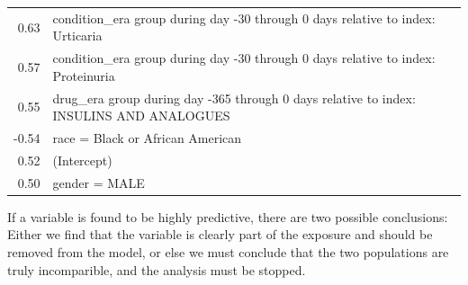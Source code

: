 \documentclass[]{book}
\let\BeginKnitrBlock\begin \let\EndKnitrBlock\end
\begin{document}
\begin{longtable}[]{@{}rl@{}}
\begin{minipage}[t]{0.07\columnwidth}\raggedleft\strut
0.63\strut
\end{minipage} & \begin{minipage}[t]{0.87\columnwidth}\raggedright\strut
condition\_era group during day -30 through 0 days relative to index:
Urticaria\strut
\end{minipage}\tabularnewline
\begin{minipage}[t]{0.07\columnwidth}\raggedleft\strut
0.57\strut
\end{minipage} & \begin{minipage}[t]{0.87\columnwidth}\raggedright\strut
condition\_era group during day -30 through 0 days relative to index:
Proteinuria\strut
\end{minipage}\tabularnewline
\begin{minipage}[t]{0.07\columnwidth}\raggedleft\strut
0.55\strut
\end{minipage} & \begin{minipage}[t]{0.87\columnwidth}\raggedright\strut
drug\_era group during day -365 through 0 days relative to index:
INSULINS AND ANALOGUES\strut
\end{minipage}\tabularnewline
\begin{minipage}[t]{0.07\columnwidth}\raggedleft\strut
-0.54\strut
\end{minipage} & \begin{minipage}[t]{0.87\columnwidth}\raggedright\strut
race = Black or African American\strut
\end{minipage}\tabularnewline
\begin{minipage}[t]{0.07\columnwidth}\raggedleft\strut
0.52\strut
\end{minipage} & \begin{minipage}[t]{0.87\columnwidth}\raggedright\strut
(Intercept)\strut
\end{minipage}\tabularnewline
\begin{minipage}[t]{0.07\columnwidth}\raggedleft\strut
0.50\strut
\end{minipage} & \begin{minipage}[t]{0.87\columnwidth}\raggedright\strut
gender = MALE\strut
\end{minipage}\tabularnewline
\bottomrule
\end{longtable}

\BeginKnitrBlock{rmdimportant}
If a variable is found to be highly predictive, there are two possible
conclusions: Either we find that the variable is clearly part of the
exposure and should be removed from the model, or else we must conclude
that the two populations are truly incomparible, and the analysis must
be stopped.
\EndKnitrBlock{rmdimportant}
\end{document}

